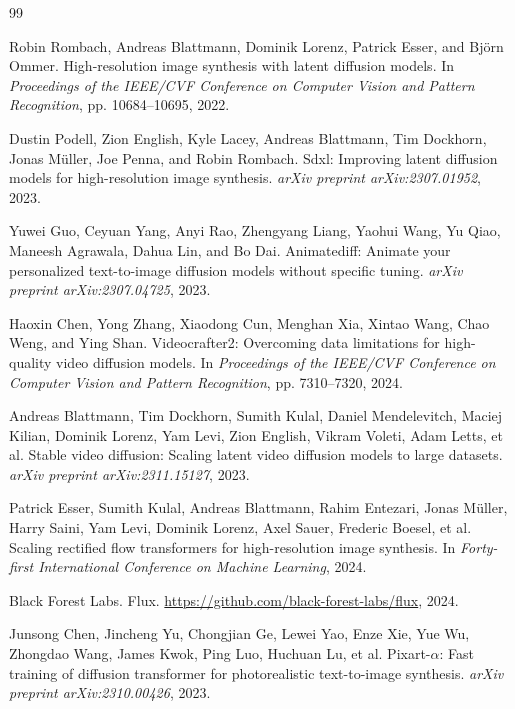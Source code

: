\documentclass{article}
\begin{document}
\begin{thebibliography}{99}                                                             
\small

Robin Rombach, Andreas Blattmann, Dominik Lorenz, Patrick Esser, and Bj\"{o}rn Ommer.
\newblock High-resolution image synthesis with latent diffusion models.
\newblock In \textit{Proceedings of the IEEE/CVF Conference on Computer Vision and Pattern Recognition}, pp. 10684--10695, 2022.

Dustin Podell, Zion English, Kyle Lacey, Andreas Blattmann, Tim Dockhorn, Jonas M\"{u}ller, Joe Penna, and Robin Rombach.
\newblock Sdxl: Improving latent diffusion models for high-resolution image synthesis.
\newblock \textit{arXiv preprint arXiv:2307.01952}, 2023.

Yuwei Guo, Ceyuan Yang, Anyi Rao, Zhengyang Liang, Yaohui Wang, Yu Qiao, Maneesh Agrawala, Dahua Lin, and Bo Dai.
\newblock Animatediff: Animate your personalized text-to-image diffusion models without specific tuning.
\newblock \textit{arXiv preprint arXiv:2307.04725}, 2023.

Haoxin Chen, Yong Zhang, Xiaodong Cun, Menghan Xia, Xintao Wang, Chao Weng, and Ying Shan.
\newblock Videocrafter2: Overcoming data limitations for high-quality video diffusion models.
\newblock In \textit{Proceedings of the IEEE/CVF Conference on Computer Vision and Pattern Recognition}, pp. 7310--7320, 2024.

Andreas Blattmann, Tim Dockhorn, Sumith Kulal, Daniel Mendelevitch, Maciej Kilian, Dominik Lorenz, Yam Levi, Zion English, Vikram Voleti, Adam Letts, et al.
\newblock Stable video diffusion: Scaling latent video diffusion models to large datasets.
\newblock \textit{arXiv preprint arXiv:2311.15127}, 2023.

Patrick Esser, Sumith Kulal, Andreas Blattmann, Rahim Entezari, Jonas M\"{u}ller, Harry Saini, Yam Levi, Dominik Lorenz, Axel Sauer, Frederic Boesel, et al.
\newblock Scaling rectified flow transformers for high-resolution image synthesis.
\newblock In \textit{Forty-first International Conference on Machine Learning}, 2024.

Black Forest Labs.
\newblock Flux.
\newblock \url{https://github.com/black-forest-labs/flux}, 2024.

Junsong Chen, Jincheng Yu, Chongjian Ge, Lewei Yao, Enze Xie, Yue Wu, Zhongdao Wang, James Kwok, Ping Luo, Huchuan Lu, et al.
\newblock Pixart-$\alpha$: Fast training of diffusion transformer for photorealistic text-to-image synthesis.
\newblock \textit{arXiv preprint arXiv:2310.00426}, 2023.


\end{thebibliography}
\end{document}
